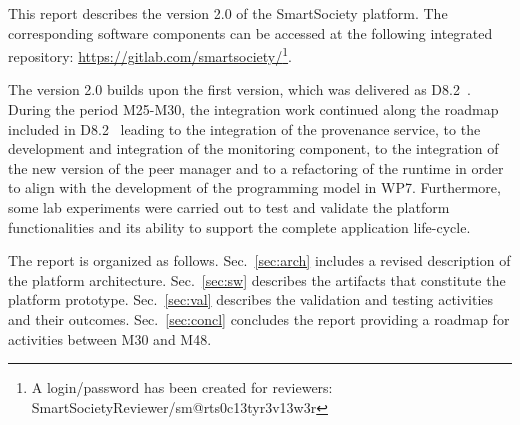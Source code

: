 This report describes the version 2.0 of the SmartSociety platform. The corresponding software components can be accessed at the following integrated repository:
\url{https://gitlab.com/smartsociety/}\footnote{A login/password has been created for reviewers: SmartSocietyReviewer/sm@rts0c13tyr3v13w3r}.%

The version 2.0 builds upon the first version, which was delivered as D8.2~\cite{D8.1}. During the period M25-M30, the integration work continued along the roadmap included in D8.2~\cite{D8.2} leading to the integration of the provenance service, to the development and integration of the monitoring component, to the integration of the new version of the peer manager and to a refactoring of the runtime in order to align with the development of the programming model in WP7. Furthermore, some lab experiments were carried out to test and validate the platform functionalities and its ability to support the complete application life-cycle. 

The report is organized as follows. Sec.~\ref{sec:arch} includes a revised description of the platform architecture. Sec.~\ref{sec:sw} describes the artifacts that constitute the platform prototype. Sec.~\ref{sec:val} describes the validation and testing activities and their outcomes. Sec.~\ref{sec:concl} concludes the report providing a roadmap for activities between M30 and M48.



